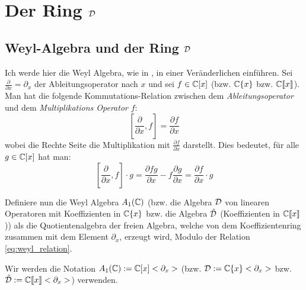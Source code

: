 
\chapter{Der Ring $\mathcal{D}$}

\section{Weyl-Algebra und der Ring $\mathcal{D}$} 
Ich werde hier die Weyl Algebra, wie in
\cite[Chapter~1]{sabbah_cimpa90}, in einer Veränderlichen einführen.
Sei $\frac{\partial}{\partial x}=\partial_x$ der Ableitungsoperator nach $x$
und sei $f \in\mathbb{C}[x]$ (bzw. $\mathbb{C}\{x\}$ bzw. $\mathbb{C}\llbracket x\rrbracket$).
Man hat die folgende Kommutations-Relation zwischen dem
\emph{Ableitungsoperator}
und dem \emph{Multiplikations Operator} $f$:
\begin{equation}\label{eq:weyl_relation}
[\frac{\partial}{\partial x},f]=\frac{\partial f}{\partial x}
\end{equation}
wobei die Rechte Seite die Multiplikation mit $\frac{\partial f}{\partial x}$
darstellt. Dies bedeutet, für alle $g\in\mathbb{C}[x]$ hat man:
\[
[\frac{\partial}{\partial x},f]\cdot g
=\frac{\partial fg}{\partial x} - f\frac{\partial g}{\partial x}
=\frac{\partial f}{\partial x} \cdot g
\]
\begin{defn}
Definiere nun die Weyl Algebra $A_1(\mathbb{C})$ (bzw. die Algebra $\mathcal{D}$ von
linearen Operatoren mit Koeffizienten in $\mathbb{C}\{x\}$ bzw. die Algebra
$\hat{\mathcal{D}}$ (Koeffizienten in $\mathbb{C}\llbracket x\rrbracket$)) als die
Quotientenalgebra der freien Algebra, welche von dem Koeffizientenring
zusammen mit dem Element $\partial_x$, erzeugt wird, Modulo der Relation
\eqref{eq:weyl_relation}.
\end{defn}
\begin{comment}
\begin{defn}
Definiere nun den Ring $\cD_k$ als die
Quotientenalgebra der freien Algebra, welche von dem Koeffizientenring
zusammen mit dem Element $\partial_x$, erzeugt wird, Modulo der Relation
\eqref{eq:weyl_relation}.
Wir schreiben diesen Ring als
\begin{itemize}
\item $A_1(\C)$ falls $k=\C[x]$, und nenne ihn die \emph{Weyl Algebra}
\item $\cD$ falls $k=\C\{x\}$
\item $\hat\cD$ falls $k=\Cfx$
\item $\cD_K$ falls $k=K\overset{\mbox{def}}{=}\C(\{x\}):=\C\{x\}[x^{-1}]$
\item $\cD_{\hat K}$ falls $k=\hat K\overset{\mbox{def}}{=}\Cfxl:=\Cfx[x^{-1}]$
\end{itemize}
\end{defn}
\end{comment}
Wir werden die Notation $A_1(\mathbb{C}):=\mathbb{C}[x]<\partial_x>$ (bzw.
$\mathcal{D}:=\mathbb{C}\{x\}<\partial_x>$ bzw. 
$\hat{\mathcal{D}}:=\mathbb{C}\llbracket x\rrbracket<\partial_x>$) verwenden.

